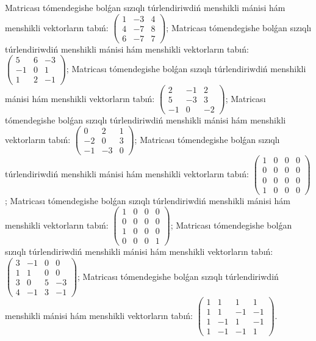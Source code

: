 Matricası tómendegishe bolǵan sızıqlı túrlendiriwdiń menshikli mánisi hám menshikli vektorların tabıń: \(\begin{pmatrix} 1 & - 3 & 4 \\ 4 & - 7 & 8 \\ 6 & - 7 & 7 \end{pmatrix}\);
Matricası tómendegishe bolǵan sızıqlı túrlendiriwdiń menshikli mánisi hám menshikli vektorların tabıń: \(\begin{pmatrix} 5 & 6 & - 3 \\  - 1 & 0 & 1 \\ 1 & 2 & - 1 \end{pmatrix}\);
Matricası tómendegishe bolǵan sızıqlı túrlendiriwdiń menshikli mánisi hám menshikli vektorların tabıń: \(\begin{pmatrix} 2 & - 1 & 2 \\ 5 & - 3 & 3 \\  - 1 & 0 & - 2 \end{pmatrix}\);
Matricası tómendegishe bolǵan sızıqlı túrlendiriwdiń menshikli mánisi hám menshikli vektorların tabıń: \(\begin{pmatrix} 0 & 2 & 1 \\  - 2 & 0 & 3 \\  - 1 & - 3 & 0 \end{pmatrix}\);
Matricası tómendegishe bolǵan sızıqlı túrlendiriwdiń menshikli mánisi hám menshikli vektorların tabıń: \(\begin{pmatrix} 1 & 0 & 0 & 0 \\ 0 & 0 & 0 & 0 \\ 0 & 0 & 0 & 0 \\ 1 & 0 & 0 & 0 \end{pmatrix}\);
Matricası tómendegishe bolǵan sızıqlı túrlendiriwdiń menshikli mánisi hám menshikli vektorların tabıń: \(\begin{pmatrix} 1 & 0 & 0 & 0 \\ 0 & 0 & 0 & 0 \\ 1 & 0 & 0 & 0 \\ 0 & 0 & 0 & 1 \end{pmatrix}\);
Matricası tómendegishe bolǵan sızıqlı túrlendiriwdiń menshikli mánisi hám menshikli vektorların tabıń: \(\begin{pmatrix} 3 & - 1 & 0 & 0 \\ 1 & 1 & 0 & 0 \\ 3 & 0 & 5 & - 3 \\ 4 & - 1 & 3 & - 1 \end{pmatrix}\);
Matricası tómendegishe bolǵan sızıqlı túrlendiriwdiń menshikli mánisi hám menshikli vektorların tabıń: \(\begin{pmatrix} 1 & 1 & 1 & 1 \\ 1 & 1 & - 1 & - 1 \\ 1 & - 1 & 1 & - 1 \\ 1 & - 1 & - 1 & 1 \end{pmatrix}\).